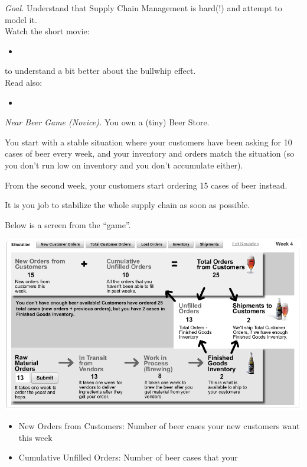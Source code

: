\emph{Goal. } Understand that Supply Chain Management is hard(!) and attempt to model it. \\


Watch the short movie:
\begin{itemize}
	\item {}
\end{itemize}
to understand a bit better about the bullwhip effect. \\


Read also:
\begin{itemize}
	\item {}
\end{itemize}






\vfill
\emph{Near Beer Game (Novice). } You own a (tiny) Beer Store.

You start with a stable situation where your customers have been asking for 10 cases of beer every week, and your inventory and orders match the situation (so you don't run low on inventory and you don't accumulate either).

From the second week, your customers start ordering 15 cases of beer instead.

It is you job to stabilize the whole supply chain as soon as possible.

Below is a screen from the ``game''.
\begin{center}
\includegraphics*[width=400pt]{images/project-bullwhip-Near_Beer_Game.png}
\end{center}

\begin{itemize}
\item New Orders from Customers: Number of beer cases your new customers want this week
\item Cumulative Unfilled Orders: Number of beer cases that your 
\end{itemize}




